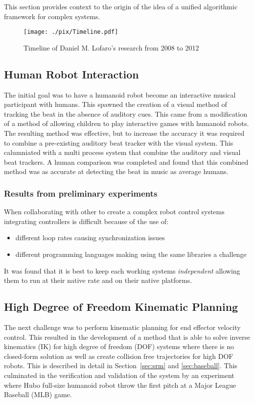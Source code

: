 This section provides context to the origin of the idea of a unified algorithmic framework for complex systems.

\begin{figure}[thpb]
  \centering
\texttt{[image: ./pix/Timeline.pdf]}
  \caption{Timeline of Daniel M. Lofaro's research from 2008 to 2012}
  \label{fig:timeline}
\end{figure}

\subsection{Human Robot Interaction}
The initial goal was to have a humanoid robot become an interactive musical participant with humans.
This spawned the creation of a visual method of tracking the beat in the absence of auditory cues\cite{5686847}.
This came from a modification of a method of allowing children to play interactive games with humanoid robots\cite{lofaroGamesRobot}.
The resulting method was effective, but to increase the accuracy it was required to combine a pre-existing auditory beat tracker with the visual system.
This calumniated with a multi process system that combine the auditory and visual beat trackers\cite{lofaroIASTED2011,6094987,lofaroEURASIP2011}.
A human comparison was completed and found that this combined method was as accurate at detecting the beat in music as average humans.

\subsubsection{Results from preliminary experiments}
When collaborating with other to create a complex robot control systems integrating controllers is difficult because of the use of:
\begin{itemize}
\item different loop rates causing synchronization issues
\item different programming languages making using the same libraries a challenge
\end{itemize}

It was found that it is best to keep each working systems \textit{independent} allowing them to run at their native rate and on their native platforms\cite{ach}.



\subsection{High Degree of Freedom Kinematic Planning}
The next challenge was to perform kinematic planning for end effector velocity control. 
This resulted in the development of a method that is able to solve inverse kinematics (IK) for high degree of freedom (DOF) systems where there is no closed-form solution as well as create collision free trajectories for high DOF robots\cite{6385987}.
This is described in detail in Section~\ref{sec:srm} and \ref{sec:baseball}.
This culminated in the verification and validation of the system by an experiment where Hubo full-size humanoid robot throw the first pitch at a Major League Baseball (MLB) game\cite{lofaroHumanoids2012,6462956}.

